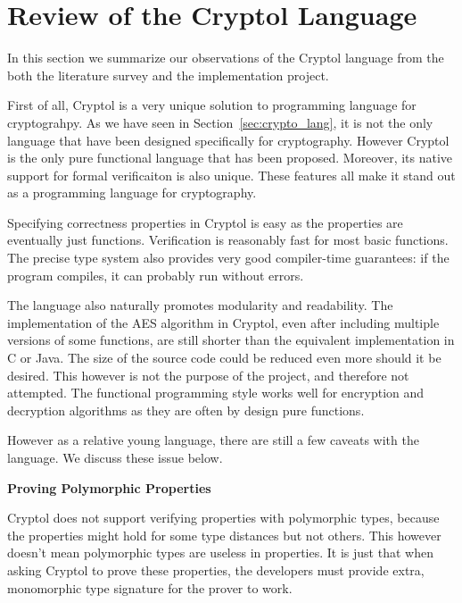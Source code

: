 \documentclass[a4paper, notitlepage]{report}
\renewcommand{\paragraph}[1]{\vspace*{1em}\noindent\textbf{#1}\hspace*{1em}}
\begin{document}
\section{Review of the Cryptol Language}
\label{sec:review}

In this section we summarize our observations of the Cryptol language from the both
 the literature survey and the implementation project. 

First of all, Cryptol is a very unique solution to programming language for cryptograhpy.
As we have seen in Section~\ref{sec:crypto_lang}, it is not the only language that have
been designed specifically for cryptography. However Cryptol is the only pure functional
language that has been proposed. Moreover, its native support for formal verificaiton is
also unique. These features all make it stand out as a programming language for 
cryptography.

Specifying correctness properties in Cryptol is easy as the properties are eventually
just functions. Verification is reasonably fast for most basic functions. 
The precise type system also provides very good compiler-time guarantees: if the program 
compiles, it can probably run without errors.

The language also naturally promotes modularity and readability.
The implementation of the AES algorithm in Cryptol, even after including multiple 
versions of some functions, are still shorter than the equivalent implementation
in C or Java. The size of the source code could be reduced even more should it be
 desired. This however is not the purpose of the project, and therefore not attempted.
The functional programming style works well for encryption and decryption algorithms
as they are often by design pure functions.

However as a relative young language, there are still a few caveats with the language.
We discuss these issue below.

\paragraph{Proving Polymorphic Properties}

Cryptol does not support verifying properties with polymorphic types, because the 
properties might hold for some type distances but not others. This however doesn't mean
polymorphic types are useless in properties. It is just that when asking Cryptol
to prove these properties, the developers must provide extra, monomorphic type
signature for the prover to work.
\end{document}
